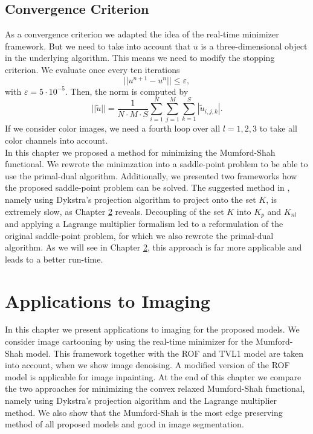 \documentclass[abstracton]{scrreprt}
\begin{document}
    \section{Convergence Criterion} %
    \label{sec:convergence_criterion}
    
        As a convergence criterion we adapted the idea of the real-time minimizer framework. But we need to take into account that $u$ is a three-dimensional object in the underlying algorithm. This means we need to modify the stopping criterion. We evaluate once every ten iterations
            $$
                ||u^{n+1} - u^{n}|| \le \varepsilon,
            $$
        with $\varepsilon = 5 \cdot 10^{-5}$. Then, the norm is computed by
            $$
                ||\tilde{u}|| = \frac{1}{N \cdot M \cdot S} \sum_{i = 1}^{N} \sum_{j = 1}^{M} \sum_{k = 1}^{S} |\tilde{u}_{i,j,k}|.
            $$
        If we consider color images, we need a fourth loop over all $l = 1, 2, 3$ to take all color channels into account.\\


    In this chapter we proposed a method for minimizing the Mumford-Shah functional. We rewrote the minimzation into a saddle-point problem to be able to use the primal-dual algorithm. Additionally, we presented two frameworks how the proposed saddle-point problem can be solved. The suggested method in \cite{Pock-et-al-iccv09}, namely using Dykstra's projection algorithm to project onto the set $K$, is extremely slow, as Chapter \ref{cha:applications_to_imaging} reveals. Decoupling of the set $K$ into $K_{p}$ and $K_{nl}$ and applying a Lagrange multiplier formalism led to a reformulation of the original saddle-point problem, for which we also rewrote the primal-dual algorithm. As we will see in Chapter \ref{cha:applications_to_imaging}, this approach is far more applicable and leads to a better run-time.


\chapter{Applications to Imaging} %
\label{cha:applications_to_imaging}

    In this chapter we present applications to imaging for the proposed models. We consider image cartooning by using the real-time minimizer for the Mumford-Shah model. This framework together with the ROF and TVL1 model are taken into account, when we show image denoising. A modified version of the ROF model is applicable for image inpainting. At the end of this chapter we compare the two approaches for minimizing the convex relaxed Mumford-Shah functional, namely using Dykstra's projection algorithm and the Lagrange multiplier method. We also show that the Mumford-Shah is the most edge preserving method of all proposed models and good in image segmentation.
\end{document}
